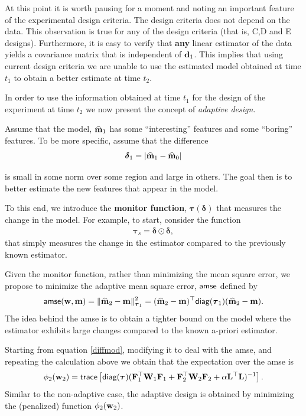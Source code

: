\documentclass[11pt]{article}
\newcommand{\bfF}	{{\bf{F}}}
\newcommand{\bfL}	{{\bf{L}}}
\newcommand{\bfW}	{{\bf{W}}}
\newcommand{\bfd}	{{\bf{d}}}
\newcommand{\bfm}	{{\bf{m}}}
\newcommand{\bfw}	{{\bf{w}}}
\newcommand{\bftau}      {{\boldsymbol \tau}}
\newcommand{\bfdelta}	 { { \boldsymbol \delta} }
\newcommand{\LtL}       { \bfL^{\top}\bfL}
\newcommand{\bfmhat}    {{\widehat{\bfm}}}
\begin{document}
\bigskip

At this point it is worth  pausing for a moment and noting an important feature of the experimental design criteria. 
 The design criteria does not depend on the data. This observation is true for any of the 
 design criteria  (that is, C,D and E designs). 
 Furthermore, it is easy to verify that {\bf any} linear estimator of the data 
 yields a covariance matrix that is independent of $\bfd_{1}$.
 This implies that using current design criteria we are unable to
 use the estimated model obtained at time $t_{1}$  to obtain a better estimate at time $t_{2}$.

\bigskip


In order to use the information obtained at time $t_{1}$ for the design of the experiment at time $t_{2}$
 we now present the concept of {\em adaptive design}.

 Assume that the model, $\bfmhat_{1}$ has some ``interesting'' features and some ``boring'' features.
To be more specific, assume that the difference
\begin{eqnarray*}
\label{diff}
 \bfdelta_{1} = |\bfmhat_{1} - \bfmhat_{0}|
\end{eqnarray*}


is small in some norm over some region and large in others. The goal then is to better estimate the new features
that appear in the model.

To this end, we introduce the {\bf monitor function}, $\bftau(\bfdelta)$ that measures
the change in the model. 
For example, to start, consider the function
\begin{eqnarray}
\label{taufuns}
\bftau_{s} = \bfdelta \odot \bfdelta,
\end{eqnarray}
that simply measures the change in the estimator
compared to the previously known estimator. 

Given the monitor function,
rather than minimizing the mean square error, we propose to minimize the
adaptive mean square error, ${\sf amse}$ defined by
\begin{eqnarray}
\label{amse}
{\sf amse}(\bfw,\bfm) = \| \bfmhat_2 -\bfm \|_{\bftau_1}^{2} = 
 (\bfmhat_2 -\bfm)^{\top}{\sf diag}(\bftau_1)(\bfmhat_2 -\bfm).
 \end{eqnarray}
The idea behind the {\sf amse} is to obtain a tighter bound on the model where the estimator exhibits large changes
compared to the known a-priori estimator. 

Starting from  equation \eqref{diffmod}, modifying it to deal with the {\sf amse}, and repeating the calculation above we obtain that the expectation 
over the {\sf amse} is
\begin{eqnarray}
\label{design2ad}
\phi_{2}(\bfw_{2}) =  {\sf trace} \left[  {\sf diag}(\bftau) (\bfF_{1}^{\top}\bfW_{1}\bfF_{1}   + \bfF_{2}^{\top}\bfW_{2}\bfF_{2} +
\alpha \LtL)^{-1} \right]. 
\end{eqnarray}
Similar to the non-adaptive case, the adaptive design is obtained by minimizing the (penalized) 
function $\phi_{2}(\bfw_{2})$.
\end{document}
